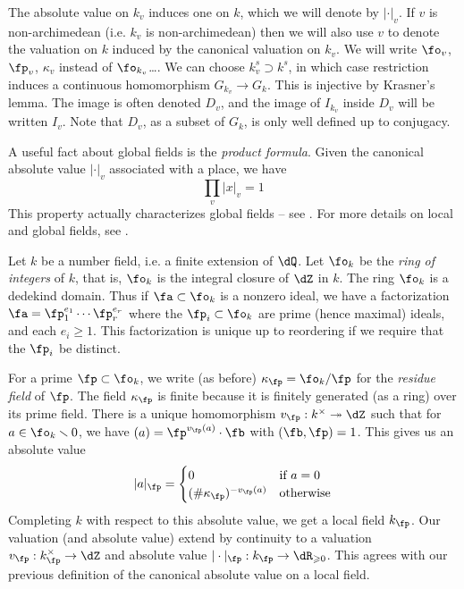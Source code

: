 The absolute value on $k_v$ induces one on $k$, which we will denote by 
$|\cdot|_v$. If $v$ is non-archimedean (i.e. $k_v$ is non-archimedean) then we 
will also use $v$ to denote the valuation on $k$ induced by the canonical 
valuation on $k_v$. We will write $\fo_v$, $\fp_v$, $\kappa_v$ instead of 
$\fo_{k_v}$\ldots. We can choose $k_v^s\supset k^s$, in which case restriction 
induces a continuous homomorphism $G_{k_v} \to G_k$. This is injective by 
Krasner's lemma. The image is often denoted $D_v$, and the image of 
$I_{k_v}$ inside $D_v$ will be written $I_v$. Note that $D_v$, as a subset of 
$G_k$, is only well defined up to conjugacy. 

A useful fact about global fields is the \emph{product formula}. Given the 
canonical absolute value $|\cdot|_v$ 
associated with a place, we have 
\[
  \prod_v |x|_v = 1
\]
This property actually characterizes global fields -- see \cite{ar45}. For 
more details on local and global fields, see \cite{we95}. 




Let $k$ be a number field, i.e. a finite extension of $\dQ$. Let $\fo_k$ be the 
\emph{ring of integers} of $k$, that is, $\fo_k$ is the integral closure of 
$\dZ$ in $k$. The ring $\fo_k$ is a dedekind domain. Thus if $\fa\subset \fo_k$ 
is a nonzero ideal, we have a factorization $\fa=\fp_1^{e_1}\dotsm \fp_r^{e_r}$ 
where the $\fp_i\subset\fo_k$ are prime (hence maximal) ideals, and each 
$e_i\geqslant 1$. This factorization is unique up to reordering if we require 
that the $\fp_i$ be distinct. 

For a prime $\fp\subset \fo_k$, we write (as before) $\kappa_\fp = \fo_k/\fp$ 
for the \emph{residue field} of $\fp$. The field $\kappa_\fp$ is finite because 
it is finitely generated (as a ring) over its prime field. There is a unique 
homomorphism $v_\fp:k^\times \twoheadrightarrow \dZ$ such that for 
$a\in \fo_k\smallsetminus 0$, we have $(a)=\fp^{v_\fp(a)}\cdot \fb$ with 
$(\fb,\fp)=1$. This gives us an absolute value 
\[
  |a|_\fp = \begin{cases}
              0 & \text{if $a=0$} \\
              (\# \kappa_\fp)^{-v_\fp(a)} & \text{otherwise}
            \end{cases}
\]
Completing $k$ with respect to this absolute value, we get a local field 
$k_\fp$. Our valuation (and absolute value) extend by continuity to a 
valuation $v_\fp:k_\fp^\times\to\dZ$ and absolute value 
$|\cdot|_\fp:k_\fp\to\dR_{\geqslant 0}$. This agrees with our previous 
definition of the canonical absolute value on a local field. 

